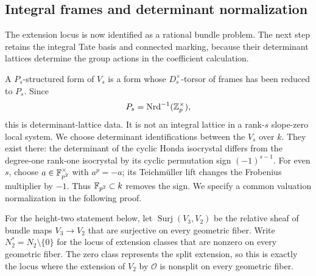 \subsection{Integral frames and determinant normalization}

The extension locus is now identified as a rational bundle problem.
The next step retains the integral Tate basis and connected marking,
because their determinant lattices determine the group actions in the
coefficient calculation.

A $P_s$-structured form of $V_s$ is a form whose $D_s^\times$-torsor
of frames has been reduced to $P_s$.  Since
\[
 P_s=\operatorname{Nrd}^{-1}(\mathbb Z_p^\times),
\]
this is determinant-lattice data.  It is not an integral lattice
in a rank-$s$ slope-zero local system.  We choose determinant
identifications between the $V_s$ over $k$.  They exist there:
the determinant of the cyclic Honda isocrystal differs from the
degree-one rank-one isocrystal by its cyclic permutation sign
$(-1)^{s-1}$.  For even $s$, choose $a\in\mathbb F_{p^2}^\times$
with $a^p=-a$; its Teichm\"uller lift changes the Frobenius
multiplier by $-1$.  Thus $\mathbb F_{p^2}\subset k$ removes the sign.
We specify a
common valuation normalization in the following proof.

For the height-two statement below, let
$\operatorname{Surj}(V_3,V_2)$ be the relative sheaf of bundle maps
$V_3\to V_2$ that are surjective on every geometric fiber.  Write
$N_2^*=N_2\setminus\{0\}$ for the locus of extension classes that
are nonzero on every geometric fiber.  The zero class represents the
split extension, so this is exactly the locus where the extension of
$V_2$ by $\mathcal O$ is nonsplit on every geometric fiber.


